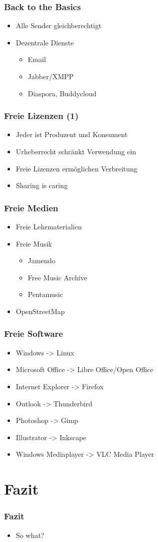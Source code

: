\documentclass{beamer}
\begin{document}
\begin{frame}
  \frametitle{Back to the Basics}
  \begin{itemize}
    \item<1-> Alle Sender gleichberechtigt
    \item<2-> Dezentrale Dienste
      \begin{itemize}
        \item<3-> Email
        \item<4-> Jabber/XMPP
        \item<5-> Diaspora, Buddycloud
      \end{itemize}
  \end{itemize}
\end{frame}

\begin{frame}
  \frametitle{Freie Lizenzen (1)}
  \begin{itemize}
    \item<1-> Jeder ist Produzent und Konsument
    \item<2-> Urheberrecht schränkt Verwendung ein
    \item<3-> Freie Lizenzen ermöglichen Verbreitung
    \item<4-> Sharing is caring
  \end{itemize}
\end{frame}

\begin{frame}
  \frametitle{Freie Medien}
  \begin{itemize}
    \item<1-> Freie Lehrmaterialien
    \item<2-> Freie Musik
      \begin{itemize}
        \item Jamendo
        \item Free Music Archive
        \item Pentamusic
      \end{itemize}
    \item<3-> OpenStreetMap
  \end{itemize}
\end{frame}

\begin{frame}
  \frametitle{Freie Software}
  \begin{itemize}
    \item Windows -> Linux
    \item Microsoft Office -> Libre Office/Open Office
    \item Internet Explorer -> Firefox
    \item Outlook -> Thunderbird
    \item Photoshop -> Gimp
    \item Illustrator -> Inkscape
    \item Windows Mediaplayer -> VLC Media Player
  \end{itemize}
\end{frame}

\section{Fazit}

\begin{frame}
  \frametitle{Fazit}
  \begin{itemize}
    \item So what?
  \end{itemize}
\end{frame}
\end{document}
